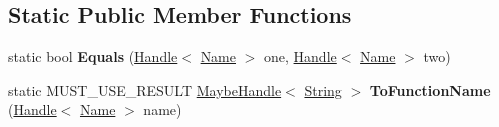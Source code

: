 \subsection*{Static Public Member Functions}
\begin{DoxyCompactItemize}
\item 
static bool {\bfseries Equals} (\hyperlink{classv8_1_1internal_1_1_handle}{Handle}$<$ \hyperlink{classv8_1_1internal_1_1_name}{Name} $>$ one, \hyperlink{classv8_1_1internal_1_1_handle}{Handle}$<$ \hyperlink{classv8_1_1internal_1_1_name}{Name} $>$ two)\hypertarget{classv8_1_1internal_1_1_name_a50a1ebb483d256a988a47585ee620b2e}{}\label{classv8_1_1internal_1_1_name_a50a1ebb483d256a988a47585ee620b2e}

\item 
static M\+U\+S\+T\+\_\+\+U\+S\+E\+\_\+\+R\+E\+S\+U\+LT \hyperlink{classv8_1_1internal_1_1_maybe_handle}{Maybe\+Handle}$<$ \hyperlink{classv8_1_1internal_1_1_string}{String} $>$ {\bfseries To\+Function\+Name} (\hyperlink{classv8_1_1internal_1_1_handle}{Handle}$<$ \hyperlink{classv8_1_1internal_1_1_name}{Name} $>$ name)\hypertarget{classv8_1_1internal_1_1_name_a980dd08354a0c63dc884e81816ae16c4}{}\label{classv8_1_1internal_1_1_name_a980dd08354a0c63dc884e81816ae16c4}

\end{DoxyCompactItemize}
